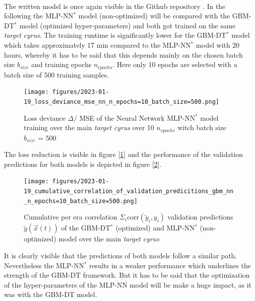 \documentclass[12pt, a4paper]{article}
\begin{document}
\\
The written model is once again visible in the Github repository \cite{Gschaider}. In the following the MLP-NN$^{\ast}$ model (non-optimized) will be compared with the GBM-DT$^{\ast}$ model (optimized hyper-parameters) and both got trained on the same \textit{target cyrus}. The training runtime is significantly lower for the GBM-DT$^{\ast}$ model which takes approximately 17 min compared to the MLP-NN$^{\ast}$ model with 20 hours, whereby it has to be said that this depends mainly on the chosen batch size $b_{size}$ and training epochs $n_{epochs}$. Here only 10 epochs are selected with a batch size of 500 training samples.
\begin{figure}[!htpb]
    \centering
    \texttt{[image: figures/2023-01-19\_loss\_deviance\_mse\_nn\_n\_epochs=10\_batch\_size=500.png]}
    \caption[Loss deviance from the Neural Network training]{Loss deviance $\Delta$/ MSE of the Neural Network MLP-NN$^{\ast}$ model training over the main \textit{target cyrus} over 10 $n_{epochs}$ witch batch size $b_{size}$ = 500}
    \label{fig: nn_loss}
\end{figure}
The loss reduction is visible in figure [\ref{fig: nn_loss}] and the performance of the validation predictions for both models is depicted in figure [\ref{fig: cum_corr_val_preds_gbm_nn}].
\begin{figure}[!htpb]
    \centering
    \texttt{[image: figures/2023-01-19\_cumulative\_correlation\_of\_validation\_predicitions\_gbm\_nn\_n\_epochs=10\_batch\_size=500.png]}
    \caption[Cumulative per era correlation of validation predictions over the GBM-DT$^{\ast}$ models with different targets]{Cumulative per era correlation $\Sigma_i \text{corr}(\tilde{y}_i,y_i)$ validation predictions $\tilde{y}(\vec{x}(t))$ of the GBM-DT$^{\ast}$ (optimized) and MLP-NN$^{\ast}$ (non-optimized) model over the main \textit{target cyrus}}
    \label{fig: cum_corr_val_preds_gbm_nn}
\end{figure}
It is clearly visible that the predictions of both models follow a similar path. Nevertheless the MLP-NN$^{\ast}$ results in a weaker performance which underlines the strength of the GBM-DT framework. But it has to be said that the optimization of the hyper-parameters of the MLP-NN model will be make a huge impact, as it was with the GBM-DT model.
\newpage
\end{document}
